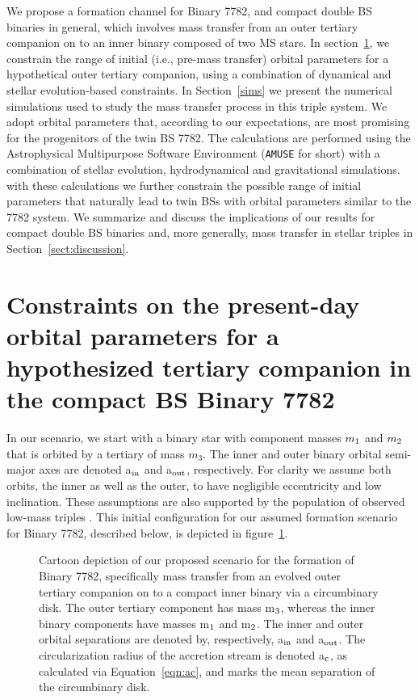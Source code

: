 \documentclass{aastex62}
\begin{document}
We propose a formation channel for Binary 7782, and compact double BS
binaries in general, which involves mass transfer from an outer
tertiary companion on to an inner binary composed of two MS 
stars.  In section~\ref{sect:dyn}, we constrain the range of initial
(i.e., pre-mass transfer) orbital parameters for a hypothetical outer
tertiary companion, using a combination of dynamical and stellar
evolution-based constraints.  In Section~\ref{sims} we present the
numerical simulations used to study the mass transfer process in this triple
system. We adopt orbital parameters that, according to our expectations,
are most promising for the progenitors of the twin BS 7782.  The calculations are
performed using the Astrophysical Multipurpose Software Environment
(\texttt{AMUSE} for short) \cite{AMUSE} with a combination of stellar
evolution, hydrodynamical and gravitational simulations.  with these
calculations we further constrain the possible range of initial
parameters that naturally lead to twin BSs with orbital parameters
similar to the 7782 system.  We summarize and discuss the implications
of our results for compact double BS binaries and, more generally,
mass transfer in stellar triples in Section~\ref{sect:discussion}.

\section{Constraints on the present-day orbital parameters for a hypothesized
         tertiary companion in the compact BS Binary 7782} \label{sect:dyn}

In our scenario, we start with a binary star with component masses
$m_{\rm 1}$ and $m_{\rm 2}$ that is orbited by a tertiary of mass
$m_3$. The inner and outer binary orbital semi-major axes are denoted
a$_{\rm in}$ and a$_{\rm out}$, respectively.  For clarity we 
assume both orbits, the inner as well as the outer, to have negligible
eccentricity and low inclination.  These assumptions are also
supported by the population of observed low-mass triples
\cite{2010yCat..73890925T,moe18}.  This initial configuration for our
assumed formation scenario for Binary 7782, described below, is
depicted in figure~\ref{fig:fig1}.

\begin{figure}[ht!]
\caption{Cartoon depiction of our proposed scenario for the formation
  of Binary 7782, specifically mass transfer from an evolved outer
  tertiary companion on to a compact inner binary via a circumbinary
  disk.  The outer tertiary component has mass m$_{\rm 3}$, whereas
  the inner binary components have masses m$_{\rm 1}$ and m$_{\rm 2}$.
  The inner and outer orbital separations are denoted by,
  respectively, a$_{\rm in}$ and a$_{\rm out}$.  The circularization
  radius of the accretion stream is denoted a$_{\rm c}$, as calculated
  via Equation~\ref{eqn:ac}, and marks the mean separation of the
  circumbinary disk.
\label{fig:fig1}}
\end{figure}
\end{document}
